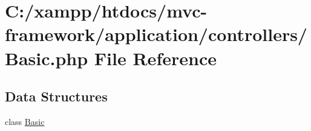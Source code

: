 \hypertarget{controllers_2_basic_8php}{}\section{C\+:/xampp/htdocs/mvc-\/framework/application/controllers/\+Basic.php File Reference}
\label{controllers_2_basic_8php}
\subsection*{Data Structures}
\begin{DoxyCompactItemize}
\item 
class \hyperlink{class_basic}{Basic}
\end{DoxyCompactItemize}
